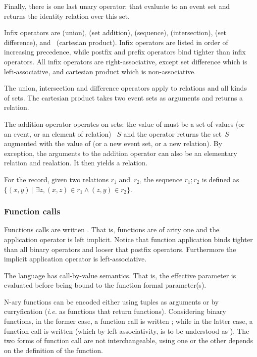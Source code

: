 Finally, there is one last unary operator: \synt{\T{[}\NT{expr}\T{]}}
that evaluate  to an event set and returns the identity
relation over this set.

Infix operators are
\T{|} (union), \T{++} (set addition),
\T{;} (sequence), \T{\&} (intersection), \T{\textbackslash} (set difference),
and~\T{*} (cartesian product).
Infix operators  are listed in order of increasing precedence,
while  postfix and prefix operators bind tighter than infix operators.
All infix operators are right-associative,
except set difference which is left-associative, and cartesian product
which is non-associative.

The union, intersection and difference operators apply to relations
and all kinds of sets. The cartesian product takes two event sets as arguments and returns
a relation.

The addition operator  operates on
sets: the value of  must be a set of values (or an event, or
an element of relation)
~$S$ and the operator returns the set~$S$ augmented with the value of
 (or a new event set, or a new relation).
By exception, the arguments to the addition operator can also be an elementary relation
and  realation. It then yields a relation.

For the record, given two relations $r_1$ and~$r_2$,
the sequence $r_1; r_2$ is defined
as $\{ (x,y) \mid \exists z, (x,z) \in r_1 \wedge (z,y) \in r_2\}$.

\subsubsection*{Function calls}
Functions calls are written .
That is, functions are of arity one and the application operator
is left implicit. Notice that function application binds tighter
than all binary operators and looser that postfix operators.
Furthermore the implicit application operator is left-associative.

The \cat{} language has call-by-value semantics. That is,
the effective parameter
 is evaluated before being bound to the
function formal parameter(s).

N-ary functions can be encoded either using tuples as arguments
or by curryfication (\emph{i.e.} as functions that return functions).
Considering binary functions, in the former case,
a function call is written
;
while in the latter case, a function call is written
(which by left-associativity, is to be understood
as ).
The two forms of function call are not interchangeable, using one or the
other depends on the definition of the function.


